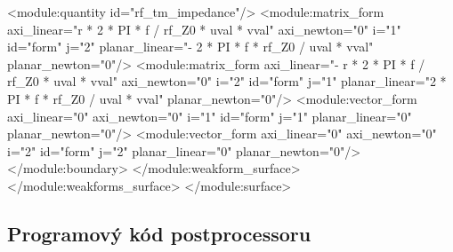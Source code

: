 \documentclass[12pt,a4paper,oneside]{article}
\numberwithin{equation}{section} %
\numberwithin{figure}{section} %
\numberwithin{table}{section} %
\begin{document}
\begin{spverbatim}
          <module:quantity id="rf_tm_impedance"/>
          <module:matrix_form axi_linear="r * 2 * PI * f / rf_Z0 * uval * vval" axi_newton="0" i="1" id="form" j="2" planar_linear="- 2 * PI * f * rf_Z0 / uval * vval" planar_newton="0"/>
          <module:matrix_form axi_linear="- r * 2 * PI * f / rf_Z0 * uval * vval" axi_newton="0" i="2" id="form" j="1" planar_linear="2 * PI * f * rf_Z0 / uval * vval" planar_newton="0"/>
          <module:vector_form axi_linear="0" axi_newton="0" i="1" id="form" j="1" planar_linear="0" planar_newton="0"/>
          <module:vector_form axi_linear="0" axi_newton="0" i="2" id="form" j="2" planar_linear="0" planar_newton="0"/>
        </module:boundary>
      </module:weakform_surface>
    </module:weakforms_surface>
  </module:surface>
\end{spverbatim}

\subsection*{Programový kód postprocessoru}
\label{postH}

\begin{spverbatim}

\end{spverbatim}
\end{document}
